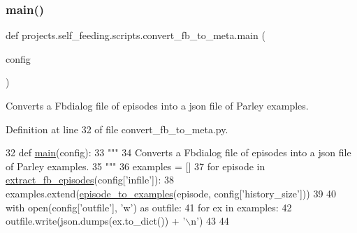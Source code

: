 \subsubsection{\texorpdfstring{main()}{main()}}
{\footnotesize\ttfamily def projects.\+self\+\_\+feeding.\+scripts.\+convert\+\_\+fb\+\_\+to\+\_\+meta.\+main (\begin{DoxyParamCaption}\item[{}]{config }\end{DoxyParamCaption})}

\begin{DoxyVerb}Converts a Fbdialog file of episodes into a json file of Parley examples.
\end{DoxyVerb}
 

Definition at line 32 of file convert\+\_\+fb\+\_\+to\+\_\+meta.\+py.


\begin{DoxyCode}
32 \textcolor{keyword}{def }\hyperlink{namespaceprojects_1_1self__feeding_1_1scripts_1_1convert__fb__to__meta_ab61505eb662980f495ad77fc2f48e76c}{main}(config):
33     \textcolor{stringliteral}{"""}
34 \textcolor{stringliteral}{    Converts a Fbdialog file of episodes into a json file of Parley examples.}
35 \textcolor{stringliteral}{    """}
36     examples = []
37     \textcolor{keywordflow}{for} episode \textcolor{keywordflow}{in} \hyperlink{namespaceprojects_1_1self__feeding_1_1utils_a813014fa481008e57bf444f8a3f88d3e}{extract\_fb\_episodes}(config[\textcolor{stringliteral}{'infile'}]):
38         examples.extend(\hyperlink{namespaceprojects_1_1self__feeding_1_1utils_a4523d4a7c4da698dda134e32acebe320}{episode\_to\_examples}(episode, config[\textcolor{stringliteral}{'history\_size'}]))
39 
40     with open(config[\textcolor{stringliteral}{'outfile'}], \textcolor{stringliteral}{'w'}) \textcolor{keyword}{as} outfile:
41         \textcolor{keywordflow}{for} ex \textcolor{keywordflow}{in} examples:
42             outfile.write(json.dumps(ex.to\_dict()) + \textcolor{stringliteral}{'\(\backslash\)n'})
43 
44 
\end{DoxyCode}
\mbox{\label{namespaceprojects_1_1self__feeding_1_1scripts_1_1convert__fb__to__meta_a4e7b9af677e57ec059b5011985d1ad87}} 
